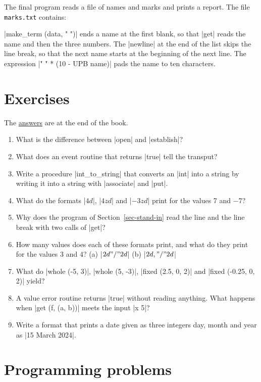 The final program reads a file of names and marks and prints a report.
The file \texttt{marks.txt} contains:



\code|make_term (data, " ")| ends a name at the first blank, so that
\code|get| reads the name and then the three numbers. The \code|newline|
at the end of the list skips the line break, so that the next name starts
at the beginning of the next line. The expression
\code|" " * (10 - UPB name)| pads the name to ten characters.

\section*{Exercises}

The \hyperref[ans-ch9]{answers} are at the end of the book.

\begin{enumerate}
\item What is the difference between \code|open| and \code|establish|?
\item What does an event routine that returns \code|true| tell the
  transput?
\item Write a procedure \code|int_to_string| that converts an
  \code|int| into a string by writing it into a string with
  \code|associate| and \code|put|.
\item What do the formats \code|$4d$|, \code|$4zd$| and \code|$-3zd$|
  print for the values 7 and $-7$?
\item Why does the program of Section~\ref{sec-stand-in} read the line
  and the line break with two calls of \code|get|?
\item How many values does each of these formats print, and what do they
  print for the values 3 and 4?
  (a) \code|$2d "/" 2d$| (b) \code|$2d, "/" 2d$|
\item What do \code|whole (-5, 3)|, \code|whole (5, -3)|,
  \code|fixed (2.5, 0, 2)| and \code|fixed (-0.25, 0, 2)| yield?
\item A value error routine returns \code|true| without reading anything.
  What happens when \code|get (f, (a, b))| meets the input
  \code|x 5|?
\item Write a format that prints a date given as three integers day,
  month and year as \code|15 March 2024|.
\end{enumerate}

\section*{Programming problems}

